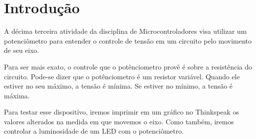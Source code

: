 \section{Introdução}

A décima terceira atividade da disciplina de Microcontroladores visa utilizar um potenciômetro para entender o controle de tensão em um circuito pelo movimento de seu eixo.

Para ser mais exato, o controle que o potênciometro provê é sobre a resistência do circuito. Pode-se dizer que o potênciometro é um resistor variável. Quando ele estiver no seu máximo, a tensão é mínima. Se estiver no mínimo, a tensão é máxima.

Para testar esse dispositivo, iremos imprimir em um gráfico no Thinkspeak os valores alterados na medida em que movemos o eixo. Como também, iremos controlar a luminosidade de um LED com o potenciômetro. 

